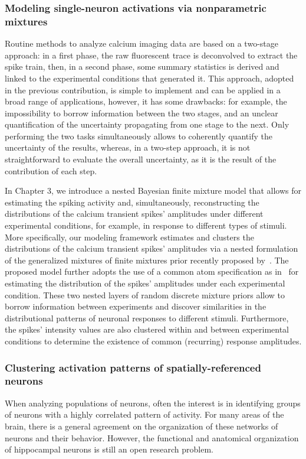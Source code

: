 \subsubsection{Modeling single-neuron activations via nonparametric mixtures}
Routine methods to analyze calcium imaging data are based on a two-stage approach: in a first phase, the raw fluorescent trace is deconvolved to extract the spike train, then, in a second phase, some summary statistics is derived and linked to the experimental conditions that generated it. 
This approach, adopted in the previous contribution, is simple to implement and can be applied in a broad range of applications, however, it has some drawbacks: for example, the impossibility to borrow information between the two stages, and an unclear quantification of the uncertainty propagating from one stage to the next. Only performing the two tasks simultaneously allows to coherently quantify the uncertainty of the results, whereas, in a two-step approach, it is not straightforward to evaluate the overall uncertainty, as it is the result of the contribution of each step. 

In Chapter 3, we introduce a nested Bayesian finite mixture model that allows for estimating the spiking activity and, simultaneously, reconstructing the distributions of the calcium transient spikes' amplitudes under different experimental conditions, for example, in response to different types of stimuli.
More specifically, our modeling framework estimates and clusters the distributions of the calcium transient spikes’ amplitudes via a nested formulation of the generalized mixtures of finite mixtures prior recently proposed by~\textcite{fruhwirthschnatter2020}. The proposed model further adopts the use of a common atom specification as in~\textcite{denti2021} for estimating the distribution of the spikes’ amplitudes under each experimental condition. 
These two nested layers of random discrete mixture priors allow to borrow information between experiments and discover similarities in the distributional patterns of neuronal responses to different stimuli. Furthermore, the spikes’ intensity values are also clustered within and between experimental conditions to determine the existence of common (recurring) response amplitudes.




\subsubsection{Clustering activation patterns of spatially-referenced neurons}
When analyzing populations of neurons, often the interest is in identifying groups of neurons with a highly correlated pattern of activity. For many areas of the brain, there is a general agreement on the organization of these networks of neurons and their behavior.
However, the functional and anatomical organization of hippocampal neurons is still an open research problem. 

